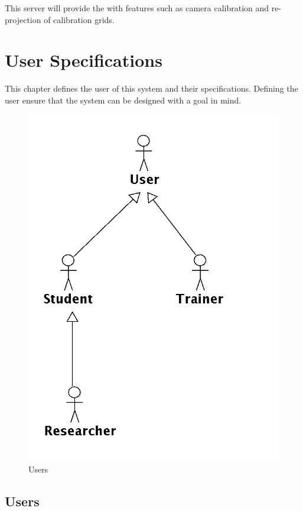 \documentclass[11pt]{report}
\begin{document}
This server will provide the  with  features such as camera calibration and re-projection of calibration grids.

\chapter{User Specifications}

This chapter defines the user of this system and their specifications. Defining the user ensure that the system can be designed with a  goal in mind. 

\begin{figure}[htp]
\centering
\includegraphics[scale=0.25]{images/UserOverview.png}
\caption{Users}
\label{fig:uo}
\end{figure}

\section{Users} 
\end{document}
